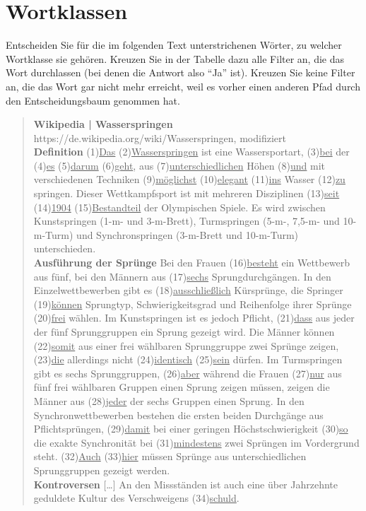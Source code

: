 \section{Wortklassen}\label{sec:bestimmen}

Entscheiden Sie für die im folgenden Text unterstrichenen Wörter, zu welcher Wortklasse sie gehören.
Kreuzen Sie in der Tabelle dazu alle Filter an, die das Wort durchlassen (bei denen die Antwort also "`Ja"' ist).
Kreuzen Sie keine Filter an, die das Wort gar nicht mehr erreicht, weil es vorher einen anderen Pfad durch den Entscheidungsbaum genommen hat.

\begin{nohyphens}\begin{quote}
  \textbf{Wikipedia | Wasserspringen}\\
  https://de.wikipedia.org/wiki/Wasserspringen, modifiziert\\[0.5\baselineskip]
  \textbf{Definition}
  (1)\ul{Das} (2)\ul{Wasserspringen} ist eine Wassersportart, (3)\ul{bei} der (4)\ul{es} (5)\ul{darum} (6)\ul{geht}, aus (7)\ul{unterschiedlichen} Höhen (8)\ul{und} mit verschiedenen Techniken (9)\ul{möglichst} (10)\ul{elegant} (11)\ul{ins} Wasser (12)\ul{zu} springen.
  Dieser Wettkampfsport ist mit mehreren Disziplinen (13)\ul{seit} (14)\ul{1904} (15)\ul{Bestandteil} der Olympischen Spiele.
  Es wird zwischen Kunstspringen (1-m- und 3-m-Brett), Turmspringen (5-m-, 7,5-m- und 10-m-Turm) und Synchronspringen (3-m-Brett und 10-m-Turm) unterschieden.\\[0.5\baselineskip]
  \textbf{Ausführung der Sprünge}
  Bei den Frauen (16)\ul{besteht} ein Wettbewerb aus fünf, bei den Männern aus (17)\ul{sechs} Sprungdurchgängen.
  In den Einzelwettbewerben gibt es (18)\ul{ausschließlich} Kürsprünge, die Springer (19)\ul{können} Sprungtyp, Schwierigkeitsgrad und Reihenfolge ihrer Sprünge (20)\ul{frei} wählen.
  Im Kunstspringen ist es jedoch Pflicht, (21)\ul{dass} aus jeder der fünf Sprunggruppen ein Sprung gezeigt wird.
  Die Männer können (22)\ul{somit} aus einer frei wählbaren Sprunggruppe zwei Sprünge zeigen, (23)\ul{die} allerdings nicht (24)\ul{identisch} (25)\ul{sein} dürfen.
  Im Turmspringen gibt es sechs Sprunggruppen, (26)\ul{aber} während die Frauen (27)\ul{nur} aus fünf frei wählbaren Gruppen einen Sprung zeigen müssen, zeigen die Männer aus (28)\ul{jeder} der sechs Gruppen einen Sprung.
  In den Synchronwettbewerben bestehen die ersten beiden Durchgänge aus Pflichtsprüngen, (29)\ul{damit} bei einer geringen Höchstschwierigkeit (30)\ul{so} die exakte Synchronität bei (31)\ul{mindestens} zwei Sprüngen im Vordergrund steht.
  (32)\ul{Auch} (33)\ul{hier} müssen Sprünge aus unterschiedlichen Sprunggruppen gezeigt werden.\\[0.5\baselineskip]
  \textbf{Kontroversen} [\ldots] An den Missständen ist auch eine über Jahrzehnte geduldete Kultur des Verschweigens (34)\ul{schuld}.
\end{quote}\end{nohyphens}

